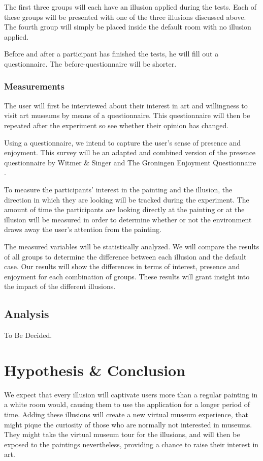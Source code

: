 \documentclass[a4paper]{article}
\begin{document}
The first three groups will each have an illusion applied during the tests. Each of these groups will be presented with one of the three illusions discussed above. The fourth group will simply be placed inside the default room with no illusion applied. 

Before and after a participant has finished the tests, he will fill out a questionnaire. The before-questionnaire will be shorter.

\subsubsection{Measurements}\label{sec:measurements}

The user will first be interviewed about their interest in art and willingness to visit art museums by means of a questionnaire. This questionnaire will then be repeated after the experiment so see whether their opinion has changed.

Using a questionnaire, we intend to capture the user's sense of presence and enjoyment. This survey will be an adapted and combined version of the presence questionnaire by Witmer \& Singer \cite{witmer} and The Groningen Enjoyment Questionnaire \cite{stevens}.

To measure the participants' interest in the painting and the illusion, the direction in which they are looking will be tracked during the experiment. The amount of time the participants are looking directly at the painting or at the illusion will be measured in order to determine whether or not the environment draws away the user's attention from the painting. 

The measured variables will be statistically analyzed. We will compare the results of all groups to determine the difference between each illusion and the default case. Our results will show the differences in terms of interest, presence and enjoyment for each combination of groups. These results will grant insight into the impact of the different illusions.


\subsection{Analysis}
To Be Decided.

\section {Hypothesis \& Conclusion}
We expect that every illusion will captivate users more than a regular painting in a white room would, causing them to use the application for a longer period of time. Adding these illusions will create a new virtual museum experience, that might pique the curiosity of those who are normally not interested in museums. They might take the virtual museum tour for the illusions, and will then be exposed to the paintings nevertheless, providing a chance to raise their interest in art. 
\end{document}
